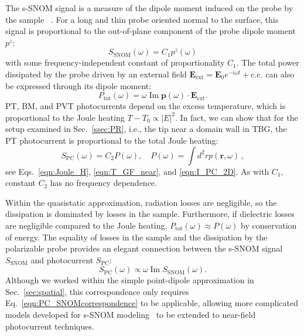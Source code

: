 \documentclass[aps, prb, reprint, superscriptaddress]{revtex4-2}
\DeclareMathOperator{\im}{Im}
\renewcommand{\vec}{\mathbf}
\begin{document}
The s-SNOM signal is a measure of the dipole moment induced on the probe by the sample ~\cite{Keilmann2004}.
For a long and thin probe oriented normal to the surface, this signal is proportional to the out-of-plane component of the probe dipole moment $p^z$: 
\begin{equation}
S_{\mathrm{SNOM}}(\omega) = C_1 p^z(\omega)
\label{eqn:PC_SNOMcorrespondence}
\end{equation}
with some frequency-independent constant of proportionality $C_1$. 
The total power dissipated by the probe driven by an external field $\vec{E}_{\text{ext}} = \vec{E}_{0}e^{-i\omega t} + \mathrm{c.c.}$ can also be expressed through its dipole moment:
\begin{equation}
\label{eqn: J_heat_tot}
P_{\mathrm{tot}}(\omega) =  \omega \im \vec{p}(\omega)\cdot\vec{E}_{\text{ext}}.
\end{equation}
PT, BM, and PVT photocurrents depend on the excess temperature, which is proportional to the Joule heating $T - T_0 \propto |E|^2$. 
In fact, we can show that for
the setup examined in Sec.~\ref{ssec:PR}, i.e., the tip near a domain wall in TBG, the PT photocurrent is proportional to the total Joule heating: 
\begin{equation}
\label{eqn:I_pc_far}
S_{\mathrm{PC}}(\omega) = C_2 P(\omega), \quad  P(\omega) = \int\! d^2 r p(\vec{r},\omega)\,, 
\end{equation}
see Eqs.~\eqref{eqn:Joule_H}, \eqref{eqn:T_GF_near}, and \eqref{eqn:I_PC_2D}.
As with $C_1$, constant $C_2$ has no frequency dependence.  

Within the quasistatic approximation, radiation losses are negligible, so the dissipation is dominated by losses in the sample. 
Furthermore, if dielectric losses are negligible compared to the Joule heating, $P_{\mathrm{tot}}(\omega) \approx P(\omega)$ by conservation of energy. 
The equality of losses in the sample and the dissipation by the polarizable probe provides an elegant connection between the s-SNOM signal $S_{\mathrm{SNOM}}$ and photocurrent $S_{\mathrm{PC}}$:
\begin{equation}
\label{eqn:PC_Snom_connection}
S_{\mathrm{PC}}(\omega) \propto \omega \im S_\mathrm{SNOM}(\omega). 
\end{equation}
Although we worked within the simple point-dipole approximation in Sec.~\ref{sec:spatial}, this correspondence only requires Eq.~\eqref{eqn:PC_SNOMcorrespondence} to be applicable, allowing more complicated models developed for s-SNOM modeling~\cite{Cvitkovic2007, McLeod2014, Jiang2016} to be extended to near-field photocurrent techniques.
\end{document}
